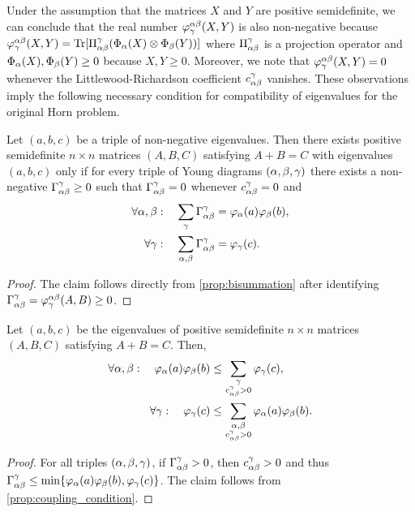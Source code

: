 \documentclass[notitlepage, 11pt, letterpaper]{amsart}
\begin{document}
Under the assumption that the matrices $X$ and $Y$ are positive semidefinite, we can conclude that the real number $\varphi^{\alpha\beta}_{\gamma}(X,Y)$ is also non-negative because $\varphi^{\alpha\beta}_{\gamma}(X,Y) = \operatorname{Tr}[\Pi^{\gamma}_{\alpha\beta} (\Phi_{\alpha}(X) \otimes \Phi_{\beta}(Y))]$ where $\Pi^{\gamma}_{\alpha\beta}$ is a projection operator and $\Phi_{\alpha}(X),\Phi_{\beta}(Y) \geq 0$ because $X,Y \geq 0$.
Moreover, we note that $\varphi^{\alpha\beta}_{\gamma}(X,Y) = 0$ whenever the Littlewood-Richardson coefficient $c^{\gamma}_{\alpha\beta}$ vanishes.
These observations imply the following necessary condition for compatibility of eigenvalues for the original Horn problem.
\begin{prop}
    \label{prop:coupling_condition}
    Let $(a,b,c)$ be a triple of non-negative eigenvalues.
    Then there exists positive semidefinite $n\times n$ matrices $(A,B,C)$ satisfying $A+B=C$ with eigenvalues $(a,b,c)$ only if for every triple of Young diagrams $(\alpha,\beta,\gamma)$ there exists a non-negative $\Gamma^{\gamma}_{\alpha\beta} \geq 0$ such that $\Gamma^{\gamma}_{\alpha\beta} = 0$ whenever $c^{\gamma}_{\alpha\beta} = 0$ and
    \begin{align}
        \forall \alpha,\beta : \quad \sum_{\gamma} \Gamma^{\gamma}_{\alpha\beta} &= \varphi_{\alpha}(a)\varphi_{\beta}(b), \\
        \forall \gamma : \quad \sum_{\alpha,\beta} \Gamma^{\gamma}_{\alpha\beta} &= \varphi_{\gamma}(c).
    \end{align}
\end{prop}
\begin{proof}
    The claim follows directly from \cref{prop:bisummation} after identifying $\Gamma^{\gamma}_{\alpha\beta} = \varphi^{\alpha\beta}_{\gamma}(A,B) \geq 0$.
\end{proof}
\begin{cor}
    \label{cor:row_col_horn_ineqs}
    Let $(a,b,c)$ be the eigenvalues of positive semidefinite $n\times n$ matrices $(A,B,C)$ satisfying $A+B=C$. Then,
    \begin{align}
        \forall \alpha,\beta : \quad \varphi_{\alpha}(a)\varphi_{\beta}(b) &\leq \sum_{\substack{\gamma\\c^{\gamma}_{\alpha\beta} > 0}}\varphi_{\gamma}(c),\\
        \forall \gamma : \quad \varphi_{\gamma}(c) &\leq \sum_{\substack{\alpha,\beta\\c^{\gamma}_{\alpha\beta} > 0}}\varphi_{\alpha}(a)\varphi_{\beta}(b).
    \end{align}
\end{cor}
\begin{proof}
    For all triples $(\alpha,\beta,\gamma)$, if $\Gamma^{\gamma}_{\alpha\beta} > 0$, then $c^{\gamma}_{\alpha\beta} > 0$ and thus $\Gamma^{\gamma}_{\alpha\beta} \leq \min\{\varphi_{\alpha}(a)\varphi_{\beta}(b), \varphi_{\gamma}(c)\}$.
    The claim follows from \cref{prop:coupling_condition}.
\end{proof}
\end{document}
